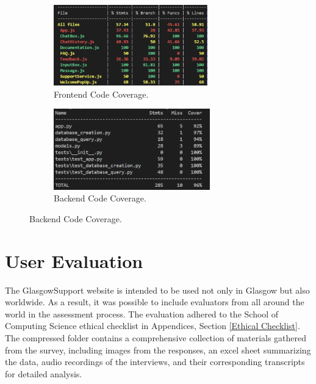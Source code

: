 \documentclass{l4proj}
\begin{document}
\begin{figure}[ht]
  \centering
  \begin{adjustbox}{valign=t}
    \begin{subfigure}[b]{0.49\textwidth}
      \centering
      \includegraphics[height=3.5cm]{images/frontendcoverage.png}
      \caption{Frontend Code Coverage.}
      \label{fig:frontendcodecoverage}
    \end{subfigure}
  \end{adjustbox}
  \hfill %
  \begin{adjustbox}{valign=t}
    \begin{subfigure}[b]{0.49\textwidth}
      \centering
      \includegraphics[height=3.5cm]{images/backendcoverage.png}
      \caption{Backend Code Coverage.}
      \label{fig:backendcodecoverage}
    \end{subfigure}
  \end{adjustbox}
\end{figure}




\section{User Evaluation}
The GlasgowSupport website is intended to be used not only in Glasgow but also worldwide. As a result, it was possible to include evaluators from all around the world in the assessment process. The evaluation adhered to the School of Computing Science ethical checklist in Appendices, Section \ref{Ethical Checklist}. The compressed folder contains a comprehensive collection of materials gathered from the survey, including images from the responses, an excel sheet summarizing the data, audio recordings of the interviews, and their corresponding transcripts for detailed analysis.
\end{document}
